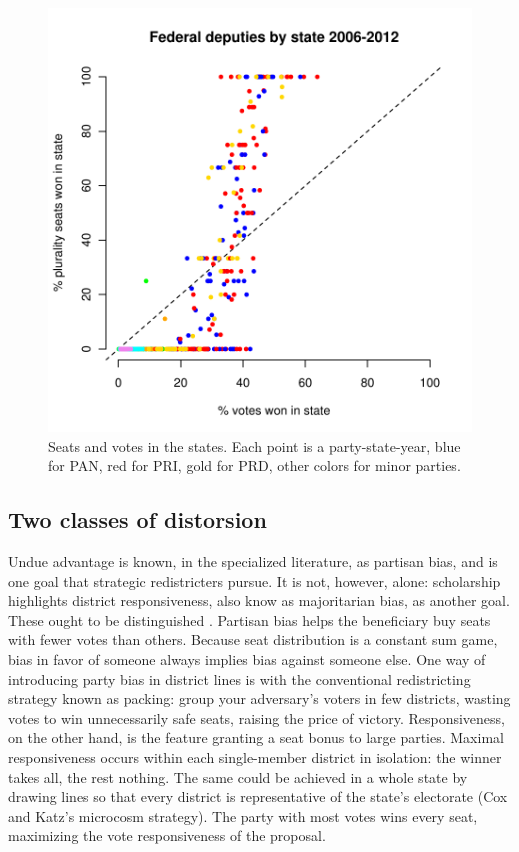 \documentclass[letter,12pt]{article}
\begin{document}
\begin{figure}
\begin{center}
    \includegraphics[width=.6\columnwidth]{../graphs/resXedo20062012.pdf} 
\caption{Seats and votes in the states. Each point is a party-state-year, blue for PAN, red for PRI, gold for PRD, other colors for minor parties.}\label{F:seatsVotes}
\end{center}
\end{figure}

\subsection{Two classes of distorsion}

Undue advantage is known, in the specialized literature, as partisan bias, and is one goal that strategic redistricters pursue. It is not, however, alone: scholarship highlights district responsiveness, also know as majoritarian bias, as another goal. These ought to be distinguished \citep[this paragraph draws heavily on][, ch.\ 3]{cox.katz.2002}. Partisan bias helps the beneficiary buy seats with fewer votes than others. Because seat distribution is a constant sum game, bias in favor of someone always implies bias against someone else. One way of introducing party bias in district lines is with the conventional redistricting strategy known as packing: group your adversary's voters in few districts, wasting votes to win unnecessarily safe seats, raising the price of victory. Responsiveness, on the other hand, is the feature granting a seat bonus to large parties. Maximal responsiveness occurs within each single-member district in isolation: the winner takes all, the rest nothing. The same could be achieved in a whole state by drawing lines so that every district is representative of the state's electorate (Cox and Katz's microcosm strategy). The party with most votes wins every seat, maximizing the vote responsiveness of the proposal. 
\end{document}

